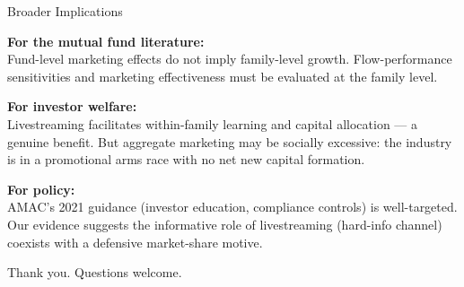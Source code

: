 \documentclass[11pt, aspectratio=169]{beamer}
\newenvironment{wideitemize}{\itemize\addtolength{\itemsep}{6pt}}{\enditemize}
\begin{document}
\begin{frame}{Broader Implications}

\begin{wideitemize}

  \item \textbf{For the mutual fund literature:}\\
  Fund-level marketing effects do not imply family-level growth.
  Flow-performance sensitivities and marketing effectiveness must
  be evaluated at the family level.

  \item \textbf{For investor welfare:}\\
  Livestreaming facilitates within-family learning and capital
  allocation --- a genuine benefit. But aggregate marketing may
  be socially excessive: the industry is in a promotional arms race
  with no net new capital formation.

  \item \textbf{For policy:}\\
  AMAC's 2021 guidance (investor education, compliance controls)
  is well-targeted. Our evidence suggests the informative role of
  livestreaming (hard-info channel) coexists with a defensive
  market-share motive.

\end{wideitemize}

\bigskip
\begin{center}
  {\large \textcolor{myblue}{Thank you. Questions welcome.}}
\end{center}

\end{frame}

\appendix
\end{document}
